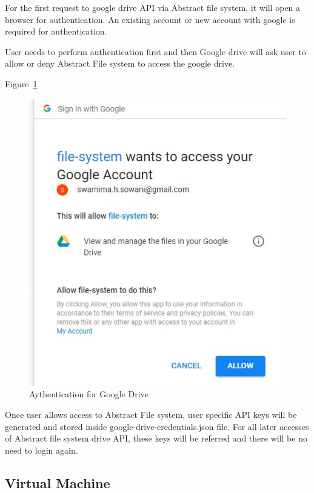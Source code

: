 For the first request to google drive API via Abstract file system, it will 
open a browser for authentication. An existing account or new account with 
google is required for authentication. 

User needs to perform authentication first and then Google drive will ask user 
to allow or deny Abstract File system to access the google drive. 

Figure~\ref{fig:auth}

\begin{figure}[!ht]
        \centering\includegraphics[width=\columnwidth]
        {image/auth.JPG}
        \caption{Aythentication for Google Drive}\label{fig:auth}
\end{figure}


Once user allows access to Abstract File system, user specific API keys will 
be generated and stored inside google-drive-credentials.json file. 
For all later accesses of Abstract file system drive API, these keys will be 
referred and there will be no need to login again. 


\subsection{Virtual Machine}

